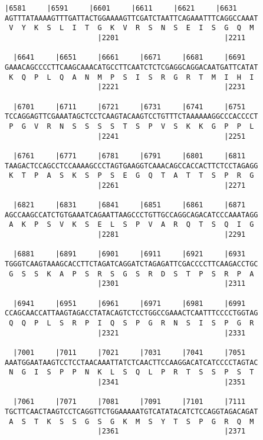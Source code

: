 \documentclass{article}
\begin{document}
\newpage
\begin{Verbatim}[fontfamily=courier]
  |6581     |6591     |6601     |6611     |6621     |6631   
AGTTTATAAAAGTTTGATTACTGGAAAAGTTCGATCTAATTCAGAAATTTCAGGCCAAAT
 V  Y  K  S  L  I  T  G  K  V  R  S  N  S  E  I  S  G  Q  M 
                      |2201                         |2211   

  |6641     |6651     |6661     |6671     |6681     |6691   
GAAACAGCCCCTTCAAGCAAACATGCCTTCAATCTCTCGAGGCAGGACAATGATTCATAT
 K  Q  P  L  Q  A  N  M  P  S  I  S  R  G  R  T  M  I  H  I 
                      |2221                         |2231   

  |6701     |6711     |6721     |6731     |6741     |6751   
TCCAGGAGTTCGAAATAGCTCCTCAAGTACAAGTCCTGTTTCTAAAAAAGGCCCACCCCT
 P  G  V  R  N  S  S  S  S  T  S  P  V  S  K  K  G  P  P  L 
                      |2241                         |2251   

  |6761     |6771     |6781     |6791     |6801     |6811   
TAAGACTCCAGCCTCCAAAAGCCCTAGTGAAGGTCAAACAGCCACCACTTCTCCTAGAGG
 K  T  P  A  S  K  S  P  S  E  G  Q  T  A  T  T  S  P  R  G 
                      |2261                         |2271   

  |6821     |6831     |6841     |6851     |6861     |6871   
AGCCAAGCCATCTGTGAAATCAGAATTAAGCCCTGTTGCCAGGCAGACATCCCAAATAGG
 A  K  P  S  V  K  S  E  L  S  P  V  A  R  Q  T  S  Q  I  G 
                      |2281                         |2291   

  |6881     |6891     |6901     |6911     |6921     |6931   
TGGGTCAAGTAAAGCACCTTCTAGATCAGGATCTAGAGATTCGACCCCTTCAAGACCTGC
 G  S  S  K  A  P  S  R  S  G  S  R  D  S  T  P  S  R  P  A 
                      |2301                         |2311   

  |6941     |6951     |6961     |6971     |6981     |6991   
CCAGCAACCATTAAGTAGACCTATACAGTCTCCTGGCCGAAACTCAATTTCCCCTGGTAG
 Q  Q  P  L  S  R  P  I  Q  S  P  G  R  N  S  I  S  P  G  R 
                      |2321                         |2331   

  |7001     |7011     |7021     |7031     |7041     |7051   
AAATGGAATAAGTCCTCCTAACAAATTATCTCAACTTCCAAGGACATCATCCCCTAGTAC
 N  G  I  S  P  P  N  K  L  S  Q  L  P  R  T  S  S  P  S  T 
                      |2341                         |2351   

  |7061     |7071     |7081     |7091     |7101     |7111   
TGCTTCAACTAAGTCCTCAGGTTCTGGAAAAATGTCATATACATCTCCAGGTAGACAGAT
 A  S  T  K  S  S  G  S  G  K  M  S  Y  T  S  P  G  R  Q  M 
                      |2361                         |2371   

\end{Verbatim}
\end{document}
